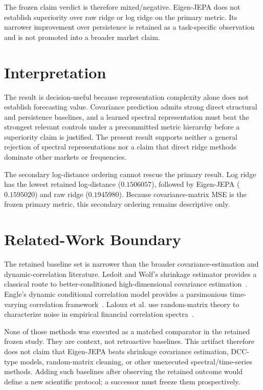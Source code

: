 \documentclass[10pt,conference]{IEEEtran}
\begin{document}
The frozen claim verdict is therefore mixed/negative. Eigen-JEPA does not establish superiority over raw ridge or log ridge on the primary metric. Its narrower improvement over persistence is retained as a task-specific observation and is not promoted into a broader market claim.

\section{Interpretation}
The result is decision-useful because representation complexity alone does not establish forecasting value. Covariance prediction admits strong direct structural and persistence baselines, and a learned spectral representation must beat the strongest relevant controls under a precommitted metric hierarchy before a superiority claim is justified. The present result supports neither a general rejection of spectral representations nor a claim that direct ridge methods dominate other markets or frequencies.

The secondary log-distance ordering cannot rescue the primary result. Log ridge has the lowest retained log-distance ($0.1506057$), followed by Eigen-JEPA ($0.1595020$) and raw ridge ($0.1945980$). Because covariance-matrix MSE is the frozen primary metric, this secondary ordering remains descriptive only.

\section{Related-Work Boundary}
The retained baseline set is narrower than the broader covariance-estimation and dynamic-correlation literature. Ledoit and Wolf's shrinkage estimator provides a classical route to better-conditioned high-dimensional covariance estimation~\cite{ledoitwolf2004}. Engle's dynamic conditional correlation model provides a parsimonious time-varying correlation framework~\cite{engle2002}. Laloux et al. use random-matrix theory to characterize noise in empirical financial correlation spectra~\cite{laloux1999}.

None of those methods was executed as a matched comparator in the retained frozen study. They are context, not retroactive baselines. This artifact therefore does not claim that Eigen-JEPA beats shrinkage covariance estimation, DCC-type models, random-matrix cleaning, or other unexecuted spectral/time-series methods. Adding such baselines after observing the retained outcome would define a new scientific protocol; a successor must freeze them prospectively.
\end{document}
